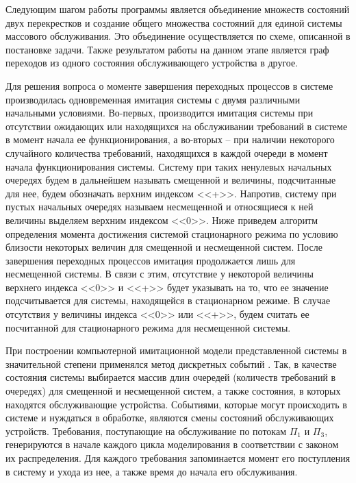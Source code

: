 \documentclass[a4paper,12pt,russian]{extarticle}
\begin{document}
Следующим шагом работы программы является объединение множеств состояний двух перекрестков и создание общего множества состояний для единой системы массового обслуживания. Это объединение осуществляется по схеме, описанной в постановке задачи. Также результатом работы на данном этапе является граф переходов из одного состояния обслуживающего устройства в другое.

Для решения вопроса о моменте завершения переходных процессов в системе производилась одновременная имитация системы с двумя различными начальными условиями. Во-первых, производится имитация системы при отсутствии ожидающих или находящихся на обслуживании требований в системе в момент начала ее функционирования, а во-вторых -- при наличии некоторого случайного количества требований, находящихся в каждой очереди  в момент начала функционирования системы. Систему при таких ненулевых начальных очередях будем в дальнейшем называть смещенной и величины, подсчитанные для нее, будем обозначать верхним индексом <<+>>. Напротив, систему при пустых начальных очередях называем несмещенной и относящиеся к ней величины выделяем верхним индексом <<0>>. Ниже приведем алгоритм определения момента достижения системой стационарного режима по условию близости некоторых величин для смещенной и несмещенной систем. После завершения переходных процессов имитация продолжается лишь для несмещенной системы. В связи с этим, отсутствие у некоторой величины верхнего индекса <<0>> и <<+>> будет указывать на то, что ее значение подсчитывается для системы, находящейся в стационарном режиме. В случае отсутствия у величины индекса <<0>> или <<+>>, будем считать ее посчитанной для стационарного режима для несмещенной системы.

При построении компьютерной имитационной модели представленной системы в значительной степени применялся метод дискретных событий \cite{averill}. Так, в качестве состояния системы выбирается массив длин очередей (количеств требований в очередях) для смещенной и несмещенной систем, а также состояния, в которых находятся обслуживающие устройства. Событиями, которые могут происходить в системе и нуждаться в обработке, являются смены состояний обслуживающих устройств. 
Требования, поступающие на обслуживание по потокам $\Pi_1$ и $\Pi_3$, генерируются в начале каждого цикла моделирования в соответствии с законом их распределения. Для каждого требования запоминается момент его поступления в систему и ухода из нее, а также время до начала его обслуживания.
\end{document}
